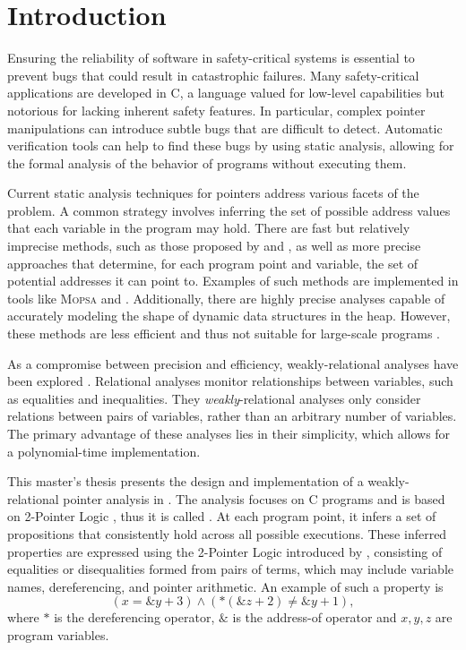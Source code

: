 
\chapter{Introduction}\label{chapter:introduction}

Ensuring the reliability of software in safety-critical systems is essential to prevent bugs that could result in catastrophic failures.
Many safety-critical applications are developed in C, a language valued for low-level capabilities but notorious for lacking inherent safety features.
In particular, complex pointer manipulations can introduce subtle bugs that are difficult to detect.
Automatic verification tools can help to find these bugs by using static analysis,
allowing for the formal analysis of the behavior of programs without executing them.

Current static analysis techniques for pointers address various facets of the problem.
A common strategy involves inferring the set of possible address values that each variable in the program may hold.
There are fast but relatively imprecise methods, such as those proposed by \textcite{Steensgaard} and \textcite{Andersen}, as well as more precise approaches that determine, for each program point and variable, the set of potential addresses it can point to.
Examples of such methods are implemented in tools like \textsc{Mopsa} \cite{mopsa} and \goblint \cite{goblint}.
Additionally, there are highly precise analyses capable of accurately modeling the shape of dynamic data structures in the heap.
However, these methods are less efficient and thus not suitable for large-scale programs \cite{rivalpapers,kreiker,predator}.

As a compromise between precision and efficiency,
weakly-relational analyses have been explored \cite{octagon,SeidlETS2023}.
Relational analyses monitor relationships between variables, such as equalities and inequalities.
They \emph{weakly}-relational analyses only consider relations between pairs of variables, rather than an arbitrary number of variables.
The primary advantage of these analyses lies in their simplicity, which allows for a polynomial-time implementation.

This master's thesis presents the design and implementation of a weakly-relational pointer analysis in \goblint.
The analysis focuses on C programs and is based on 2-Pointer Logic \cite{2pointer}, thus it is called \cpo.
At each program point, it infers a set of propositions that consistently hold across all possible executions.
These inferred properties are expressed using the 2-Pointer Logic introduced by \textcite{2pointer},
consisting of equalities or disequalities formed from pairs of terms,
which may include variable names, dereferencing, and pointer arithmetic.
An example of such a property is 
\begin{equation}\label{example:introduction}
    (x = \&y + 3) \land (*(\&z + 2) \neq \&y + 1),
\end{equation}
where $*$ is the dereferencing operator, $\&$ is the address-of operator and $x,y,z$ are program variables.

